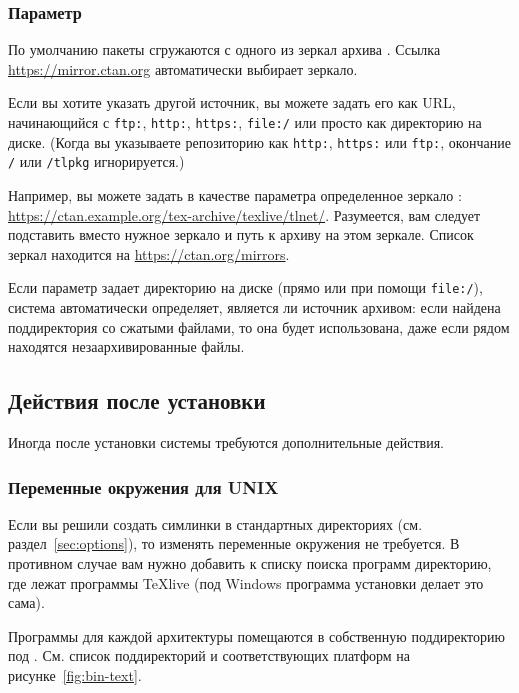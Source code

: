 \documentclass{article}
\begin{document}
\subsubsection{Параметр }
\label{sec:location}

По умолчанию пакеты сгружаются с одного из зеркал архива \CTAN. Ссылка
\url{https://mirror.ctan.org} автоматически выбирает зеркало.  

Если вы хотите указать другой источник, вы можете задать его как URL,
начинающийся с \texttt{ftp:}, \texttt{http:}, \texttt{https:},
\texttt{file:/} или просто как директорию на диске.  (Когда вы
указываете репозиторию как \texttt{http:}, \texttt{https:} или
\texttt{ftp:}, окончание \texttt{/} или \texttt{/tlpkg} игнорируется.)

Например, вы можете задать в качестве параметра определенное зеркало
\CTAN:
\url{https://ctan.example.org/tex-archive/texlive/tlnet/}.
Разумеется, вам следует подставить вместо 
нужное зеркало и путь к архиву на этом зеркале.  Список зеркал
находится на \url{https://ctan.org/mirrors}.  


Если параметр задает директорию на диске (прямо или при помощи
\texttt{file:/}), система автоматически определяет, является ли
источник архивом: если найдена поддиректория  со
сжатыми файлами, то она будет использована, даже если рядом находятся
незаархивированные файлы.



\subsection{Действия после установки}
\label{sec:postinstall}

Иногда после установки системы требуются дополнительные действия.



\subsubsection{Переменные окружения для UNIX}
\label{sec:env}

Если вы решили создать симлинки в стандартных директориях
(см. раздел~\ref{sec:options}), то изменять переменные окружения не
требуется.  В противном случае вам нужно добавить к списку поиска
программ директорию, где лежат программы \TeX live (под Windows
программа установки делает это сама).

Программы для каждой архитектуры помещаются в собственную
поддиректорию под .  См. список поддиректорий и
соответствующих платформ на рисунке~\ref{fig:bin-text}.
\end{document}
